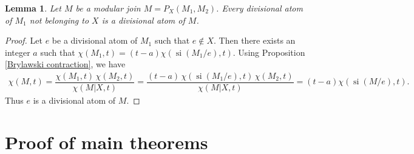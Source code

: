 \documentclass[pdftex]{sigma}
\numberwithin{equation}{section}
\newtheorem{Lemma}[Theorem]{Lemma}
\DeclareMathOperator{\si}{si}
\begin{document}
\begin{Lemma}\label{divisional atom of modular join}
Let $ M $ be a modular join $ M = P_{X}(M_{1},M_{2}) $.
Every divisional atom of $ M_{1} $ not belonging to $ X $ is a divisional atom of $ M $.
\end{Lemma}
\begin{proof}
Let $ e $ be a divisional atom of $ M_{1} $ such that $ e \not\in X $.
Then there exists an integer $ a $ such that $ \chi(M_{1},t) = (t-a)\chi(\si(M_{1}/e),t) $.
Using Proposition \ref{Brylawski contraction}, we have
\begin{align*}
\chi(M,t) = \dfrac{\chi(M_{1},t) \, \chi(M_{2},t)}{\chi(M|X,t)}
= \dfrac{(t-a) \, \chi(\si(M_{1}/e),t) \, \chi(M_{2},t)}{\chi(M|X,t)}
= (t-a)\chi(\si(M/e),t).
\end{align*}
Thus $ e $ is a divisional atom of $ M $.
\end{proof}

\section{Proof of main theorems}\label{sec: proof}
\end{document}
